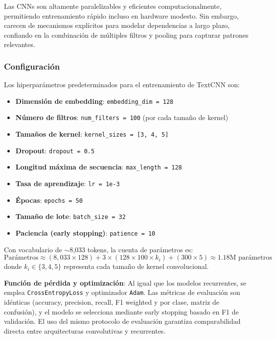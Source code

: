 \documentclass[paper=letter, fontsize=11pt, draft=false]{scrartcl}
\numberwithin{equation}{section} %
\numberwithin{figure}{section} %
\numberwithin{table}{section} %
\numberwithin{subsection}{section}
\begin{document}
Las CNNs son altamente paralelizables y eficientes computacionalmente, permitiendo entrenamiento rápido incluso en hardware modesto. Sin embargo, carecen de mecanismos explícitos para modelar dependencias a largo plazo, confiando en la combinación de múltiples filtros y pooling para capturar patrones relevantes.

\subsubsection{Configuración}

Los hiperparámetros predeterminados para el entrenamiento de TextCNN son:
\begin{itemize}
    \item \textbf{Dimensión de embedding}: \texttt{embedding\_dim = 128}
    \item \textbf{Número de filtros}: \texttt{num\_filters = 100} (por cada tamaño de kernel)
    \item \textbf{Tamaños de kernel}: \texttt{kernel\_sizes = [3, 4, 5]}
    \item \textbf{Dropout}: \texttt{dropout = 0.5}
    \item \textbf{Longitud máxima de secuencia}: \texttt{max\_length = 128}
    \item \textbf{Tasa de aprendizaje}: \texttt{lr = 1e-3}
    \item \textbf{Épocas}: \texttt{epochs = 50}
    \item \textbf{Tamaño de lote}: \texttt{batch\_size = 32}
    \item \textbf{Paciencia (early stopping)}: \texttt{patience = 10}
\end{itemize}

Con vocabulario de $\sim$8,033 tokens, la cuenta de parámetros es:
\[
\text{Parámetros} \approx (8,033 \times 128) + 3 \times (128 \times 100 \times k_i) + (300 \times 5) \approx 1.18 \text{M parámetros}
\]
donde $k_i \in \{3, 4, 5\}$ representa cada tamaño de kernel convolucional.

\textbf{Función de pérdida y optimización}: Al igual que los modelos recurrentes, se emplea \texttt{CrossEntropyLoss} y optimizador \texttt{Adam}. Las métricas de evaluación son idénticas (accuracy, precision, recall, F1 weighted y por clase, matriz de confusión), y el modelo se selecciona mediante early stopping basado en F1 de validación. El uso del mismo protocolo de evaluación garantiza comparabilidad directa entre arquitecturas convolutivas y recurrentes.
\end{document}
